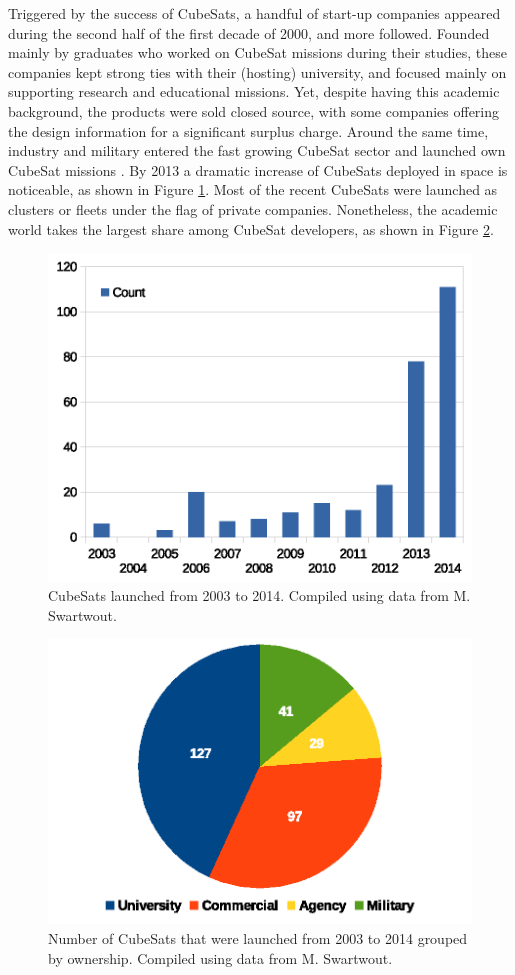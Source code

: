Triggered by the success of CubeSats, a handful of start-up companies appeared during the second half of the first decade of 2000, and more followed. Founded mainly by graduates who worked on CubeSat missions during their studies, these companies kept strong ties with their (hosting) university, and focused mainly on supporting research and educational missions. Yet, despite having this academic background, the products were sold closed source, with some companies offering the design information for a significant surplus charge. Around the same time, industry and military entered the fast growing CubeSat sector and launched own CubeSat missions \cite{taraba2009boeing}. By 2013 a dramatic increase of CubeSats deployed in space is noticeable, as shown in Figure \ref{fig:CubeSats launched from 2003 to 2014}. Most of the recent CubeSats were launched as clusters or fleets under the flag of private companies. Nonetheless, the academic world takes the largest share among CubeSat developers, as shown in Figure \ref{fig:CubeSats that were launched from 2003 to 2014 grouped by ownership}. 

\begin{figure}[h]
\centering\includegraphics[width=0.6\linewidth]{fig/cubesats_launched_from_2003_to_2014}
\caption{CubeSats launched from 2003 to 2014. Compiled using data from M. Swartwout.}
\label{fig:CubeSats launched from 2003 to 2014}
\end{figure}

\begin{figure}[h]
\centering\includegraphics[width=0.8\linewidth]{fig/cubesats_launched_from_2003_to_2014_by_ownership}
\caption{Number of CubeSats that were launched from 2003 to 2014 grouped by ownership. Compiled using data from M. Swartwout.}
\label{fig:CubeSats that were launched from 2003 to 2014 grouped by ownership}
\end{figure}

